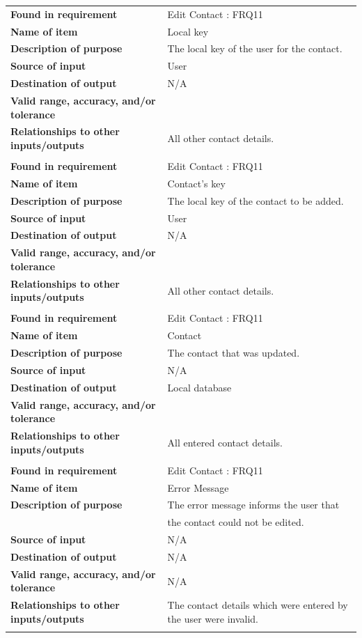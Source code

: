 \newpage
\begin{tabular}{ll}
\textbf{Found in requirement}&Edit Contact : FRQ11\\
\textbf{Name of item}&Local key\\
\textbf{Description of purpose}&The local key of the user for the contact.\\
\textbf{Source of input}&User\\
\textbf{Destination of output}&N/A\\
\textbf{Valid range, accuracy, and/or tolerance}&\\
\textbf{Relationships to other inputs/outputs}&All other contact details.\\
&\\
\textbf{Found in requirement}&Edit Contact : FRQ11\\
\textbf{Name of item}&Contact's key\\
\textbf{Description of purpose}&The local key of the contact to be added.\\
\textbf{Source of input}&User\\
\textbf{Destination of output}&N/A\\
\textbf{Valid range, accuracy, and/or tolerance}&\\
\textbf{Relationships to other inputs/outputs}&All other contact details.\\
&\\
\textbf{Found in requirement}&Edit Contact : FRQ11\\
\textbf{Name of item}&Contact\\
\textbf{Description of purpose}&The contact that was updated.\\
\textbf{Source of input}&N/A\\
\textbf{Destination of output}&Local database\\
\textbf{Valid range, accuracy, and/or tolerance}&\\
\textbf{Relationships to other inputs/outputs}&All entered contact details.\\
&\\
\textbf{Found in requirement}&Edit Contact : FRQ11\\
\textbf{Name of item}&Error Message\\
\textbf{Description of purpose}&The error message informs the user that \\&the contact could not be edited.\\
\textbf{Source of input}&N/A\\
\textbf{Destination of output}&N/A\\
\textbf{Valid range, accuracy, and/or tolerance}&N/A\\
\textbf{Relationships to other inputs/outputs}&The contact details which were entered by the user were invalid.\\
&\\
\end{tabular}

